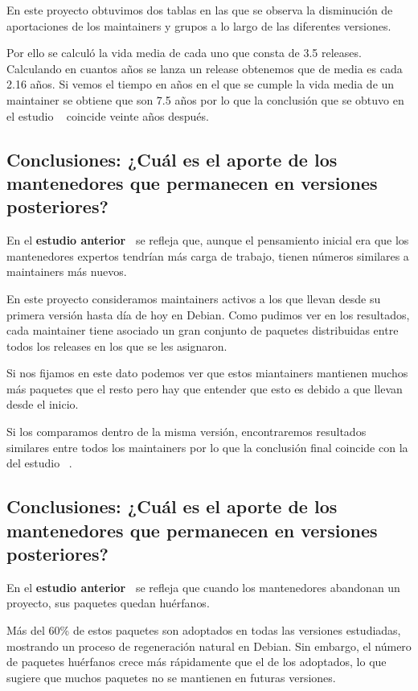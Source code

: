 \documentclass[a4paper, 12pt]{book}
\begin{document}
En este proyecto obtuvimos dos tablas en las que se observa la disminución de aportaciones de los maintainers y grupos a lo largo de las diferentes versiones.

Por ello se calculó la vida media de cada uno que consta de 3.5 releases. Calculando en cuantos años se lanza un release obtenemos que de media es cada 2.16 años. Si vemos el tiempo en años en el que se cumple la vida media de un maintainer se obtiene que son 7.5 años por lo que la conclusión que se obtuvo en el estudio ~\cite{robles05:_debian} coincide veinte años después.

\subsection{Conclusiones: ¿Cuál es el aporte de los mantenedores que permanecen en versiones posteriores?}
\label{subsec:conclusion_4}

En el \textbf{estudio anterior~\cite{robles05:_debian}} se refleja que, aunque el pensamiento inicial era que los mantenedores expertos tendrían más carga de trabajo, tienen números similares a maintainers más nuevos.

En este proyecto consideramos maintainers activos a los que llevan desde su primera versión hasta día de hoy en Debian. Como pudimos ver en los resultados, cada maintainer tiene asociado un gran conjunto de paquetes distribuidas entre todos los releases en los que se les asignaron.

Si nos fijamos en este dato podemos ver que estos miantainers mantienen muchos más paquetes que el resto pero hay que entender que esto es debido a que llevan desde el inicio.

Si los comparamos dentro de la misma versión, encontraremos resultados similares entre todos los maintainers por lo que la conclusión final coincide con la del estudio ~\cite{robles05:_debian}. 

\subsection{Conclusiones: ¿Cuál es el aporte de los mantenedores que permanecen en versiones posteriores?}
\label{subsec:conclusion_5}

En el \textbf{estudio anterior~\cite{robles05:_debian}} se refleja que cuando los mantenedores abandonan un proyecto, sus paquetes quedan huérfanos. 

Más del 60\% de estos paquetes son adoptados en todas las versiones estudiadas, mostrando un proceso de regeneración natural en Debian. Sin embargo, el número de paquetes huérfanos crece más rápidamente que el de los adoptados, lo que sugiere que muchos paquetes no se mantienen en futuras versiones. 
\end{document}
